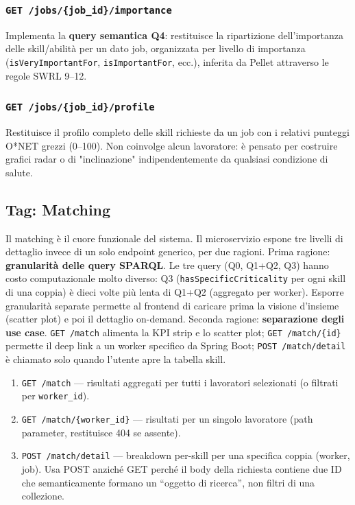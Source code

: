 \documentclass[a4paper,12pt]{article}
\begin{document}
\subsubsection{\texttt{GET /jobs/\{job\_id\}/importance}}

Implementa la \textbf{query semantica Q4}: restituisce la ripartizione
dell'importanza delle skill/abilit\`{a} per un dato job, organizzata per
livello di importanza (\texttt{isVeryImportantFor},
\texttt{isImportantFor}, ecc.), inferita da Pellet attraverso le
regole SWRL 9--12.

\subsubsection{\texttt{GET /jobs/\{job\_id\}/profile}}

Restituisce il profilo completo delle skill richieste da un job con i
relativi punteggi O*NET grezzi (0--100). Non coinvolge alcun lavoratore:
\`{e} pensato per costruire grafici radar o di "inclinazione" indipendentemente
da qualsiasi condizione di salute.

\subsection{Tag: Matching}

Il matching \`{e} il cuore funzionale del sistema. Il microservizio espone
tre livelli di dettaglio invece di un solo endpoint generico, per due ragioni.
Prima ragione: \textbf{granularit\`{a} delle query SPARQL}. Le tre query (Q0,
Q1+Q2, Q3) hanno costo computazionale molto diverso: Q3 (\texttt{hasSpecificCriticality}
per ogni skill di una coppia) \`{e} dieci volte pi\`{u} lenta di Q1+Q2
(aggregato per worker). Esporre granularit\`{a} separate permette al frontend
di caricare prima la visione d'insieme (scatter plot) e poi il dettaglio on-demand.
Seconda ragione: \textbf{separazione degli use case}. \texttt{GET /match}
alimenta la KPI strip e lo scatter plot; \texttt{GET /match/\{id\}} permette
il deep link a un worker specifico da Spring Boot; \texttt{POST /match/detail}
\`{e} chiamato solo quando l'utente apre la tabella skill.

\begin{enumerate}
  \item \texttt{GET /match} --- risultati aggregati per tutti i lavoratori
        selezionati (o filtrati per \texttt{worker\_id}).
  \item \texttt{GET /match/\{worker\_id\}} --- risultati per un singolo
        lavoratore (path parameter, restituisce 404 se assente).
  \item \texttt{POST /match/detail} --- breakdown per-skill per una specifica
        coppia (worker, job). Usa POST anzich\'{e} GET perch\'{e} il body
        della richiesta contiene due ID che semanticamente formano un
        ``oggetto di ricerca'', non filtri di una collezione.
\end{enumerate}
\end{document}
